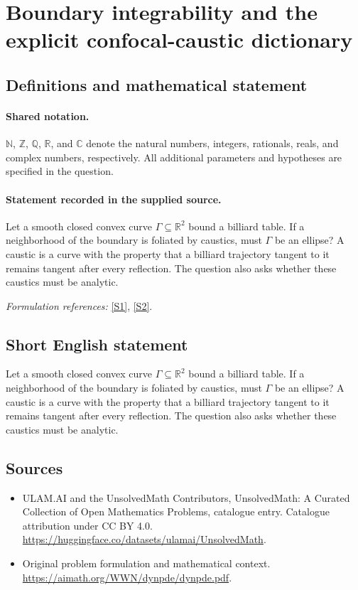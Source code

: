 \documentclass[11pt]{article}
\newcommand{\sref}[2]{\hyperlink{source:#1:#2}{[S#2]}}
\begin{document}
\section{Boundary integrability and the explicit confocal-caustic dictionary}\label{statement}

\subsection{Definitions and mathematical statement}

\paragraph{Shared notation.}$\mathbb N$, $\mathbb Z$, $\mathbb Q$, $\mathbb R$, and $\mathbb C$ denote the natural numbers, integers, rationals, reals, and complex numbers, respectively. All additional parameters and hypotheses are specified in the question.


\paragraph{Statement recorded in the supplied source.}
Let a smooth closed convex curve $\Gamma\subseteq\mathbb R^2$ bound a billiard table. If a neighborhood of the boundary is foliated by caustics, must $\Gamma$ be an ellipse? A caustic is a curve with the property that a billiard trajectory tangent to it remains tangent after every reflection. The question also asks whether these caustics must be analytic.
\par\smallskip\textit{Formulation references:} \sref{statement}{1}, \sref{statement}{2}.
\subsection{Short English statement}
Let a smooth closed convex curve $\Gamma\subseteq\mathbb R^2$ bound a billiard table. If a neighborhood of the boundary is foliated by caustics, must $\Gamma$ be an ellipse? A caustic is a curve with the property that a billiard trajectory tangent to it remains tangent after every reflection. The question also asks whether these caustics must be analytic.
\subsection{Sources}
\begin{itemize}
\item[\hypertarget{source:statement:1}{S1}] ULAM.AI and the UnsolvedMath Contributors, UnsolvedMath: A Curated Collection of Open Mathematics Problems, catalogue entry. Catalogue attribution under CC BY 4.0.
\url{https://huggingface.co/datasets/ulamai/UnsolvedMath}.
\item[\hypertarget{source:statement:2}{S2}] Original problem formulation and mathematical context.
\url{https://aimath.org/WWN/dynpde/dynpde.pdf}.
\end{itemize}
\label{end:statement}
\end{document}
